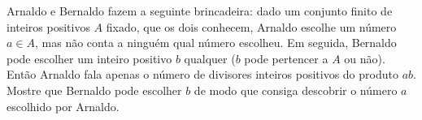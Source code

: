 Arnaldo e Bernaldo fazem a seguinte brincadeira:
dado um conjunto finito de inteiros positivos $A$ fixado, que os dois conhecem, Arnaldo escolhe um número $a \in A$, mas não conta a ninguém qual número escolheu.
Em seguida, Bernaldo pode escolher um inteiro positivo $b$ qualquer ($b$ pode pertencer a $A$ ou não).
Então Arnaldo fala apenas o número de divisores inteiros positivos do produto $ab$. Mostre que Bernaldo pode escolher $b$ de modo que consiga descobrir o número $a$ escolhido por Arnaldo.